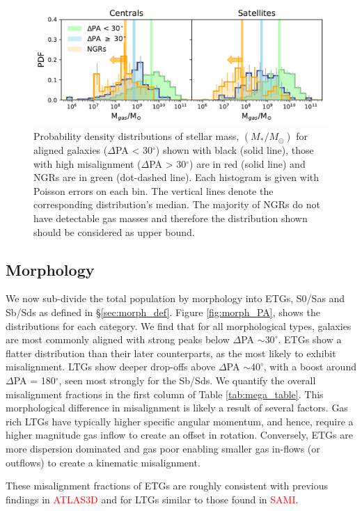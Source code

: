 \documentclass[fleqn,usenatbib]{mnras}
\newcommand{\red}[1]{{\textcolor{red}{#1}}}
\begin{document}
\begin{figure}
	\includegraphics[width=\linewidth]{total_pop/gas_mass_dist.pdf}
    \caption{Probability density distributions of stellar mass, $(M_{\ast}/M_{\odot})$ for aligned galaxies ($\Delta$PA < 30$^{\circ}$) shown with black (solid line), those with high misalignment ($\Delta$PA > 30$^{\circ}$) are in red (solid line) and NGRs are in green (dot-dashed line). Each histogram is given with Poisson errors on each bin. The vertical lines denote the corresponding distribution's median. The majority of NGRs do not have detectable gas masses and therefore the distribution shown should be considered as upper bound.}
    \label{fig:delPA_gasM}
\end{figure}

\subsection{Morphology}
We now sub-divide the total population by morphology into ETGs, S0/Sas and Sb/Sds as defined in \S\ref{sec:morph_def}. Figure \ref{fig:morph_PA}, shows the distributions for each category. We find that for all morphological types, galaxies are most commonly aligned with strong peaks below $\Delta$PA $\sim 30^{\circ}$. ETGs show a flatter distribution than their later counterparts, as the most likely to exhibit misalignment. LTGs show deeper drop-offs above $\Delta$PA $\sim 40^{\circ}$, with a boost around $\Delta$PA = 180$^{\circ}$, seen most strongly for the Sb/Sds. We quantify the overall misalignment fractions in the first column of Table \ref{tab:mega_table}. This morphological difference in misalignment is likely a result of several factors. Gas rich LTGs have typically higher specific angular momentum, and hence, require a higher magnitude gas inflow to create an offset in rotation. Conversely, ETGs are more dispersion dominated and gas poor enabling smaller gas in-flows (or outflows) to create a kinematic misalignment. 

These misalignment fractions of ETGs are roughly consistent with previous findings in \red{ATLAS3D} and for LTGs similar to those found in \red{SAMI}. 
\end{document}
